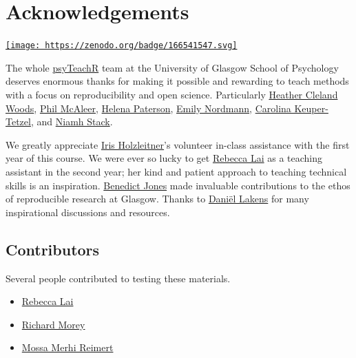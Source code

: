 \documentclass[
  oneside]{book}
\providecommand{\tightlist}{%
  \setlength{\itemsep}{0pt}\setlength{\parskip}{0pt}}
\begin{document}
\hypertarget{acknowledgements}{%
\chapter*{Acknowledgements}\label{acknowledgements}}

\href{https://zenodo.org/badge/latestdoi/166541547}{\texttt{[image: https://zenodo.org/badge/166541547.svg]}}

The whole \href{https://psyteachr.github.io}{psyTeachR} team at the University of Glasgow School of Psychology deserves enormous thanks for making it possible and rewarding to teach methods with a focus on reproducibility and open science. Particularly
\href{https://github.com/clelandwoods}{Heather Cleland Woods},
\href{https://github.com/philmcaleer}{Phil McAleer},
\href{https://github.com/HelenaPaterson}{Helena Paterson},
\href{https://github.com/emilynordmann}{Emily Nordmann},
\href{https://github.com/carolinakt}{Carolina Keuper-Tetzel}, and
\href{https://github.com/eavanmac}{Niamh Stack}.

We greatly appreciate \href{https://github.com/orgs/facelab/people/iholzleitner}{Iris Holzleitner}'s volunteer in-class assistance with the first year of this course. We were ever so lucky to get \href{https://github.com/RebeccaJLai}{Rebecca Lai} as a teaching assistant in the second year; her kind and patient approach to teaching technical skills is an inspiration. \href{https://www.strath.ac.uk/staff/jonesbenedictprofessor/}{Benedict Jones} made invaluable contributions to the ethos of reproducible research at Glasgow. Thanks to \href{https://github.com/Lakens}{Daniël Lakens} for many inspirational discussions and resources.

\hypertarget{contributors}{%
\section*{Contributors}\label{contributors}}

Several people contributed to testing these materials.

\begin{itemize}
\tightlist
\item
  \href{https://github.com/RebeccaJLai}{Rebecca Lai}
\item
  \href{https://github.com/richarddmorey}{Richard Morey}
\item
  \href{https://github.com/CGMossa}{Mossa Merhi Reimert}
\end{itemize}
\end{document}
